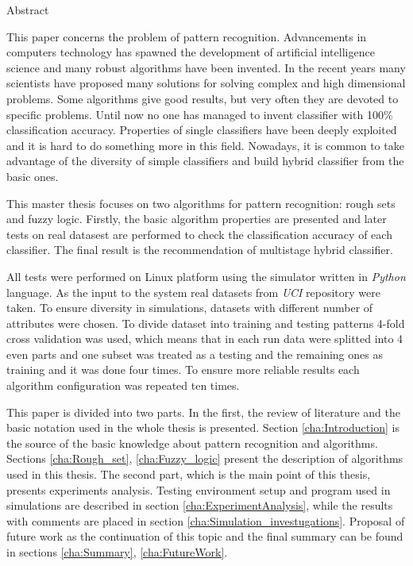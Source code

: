 \thispagestyle{empty}
\begin{center}
	Abstract
\end{center}
This paper concerns the problem of pattern recognition. Advancements in
computers technology has spawned the development of artificial intelligence science and
many robust algorithms have been invented. In the
recent years many scientists have proposed many solutions for solving complex
and high dimensional problems. Some algorithms give good results, but very
often they are devoted to specific problems. Until now no one has managed to
invent classifier with 100\% classification accuracy. Properties of single
classifiers have been deeply exploited and it is hard to do something more in
this field. Nowadays, it is common to take advantage of the diversity of simple classifiers and build 
hybrid classifier from the basic ones.

This master thesis focuses on two algorithms for pattern recognition: rough
sets and fuzzy logic. Firstly, the basic algorithm properties are presented and
later tests on real datasest are performed to check the classification accuracy
of each classifier. The final result is the recommendation of multistage hybrid
classifier.

All tests were performed on Linux platform using the simulator written in
\textit{Python} language. As the input to the system real datasets from
\textit{UCI} repository were taken. To ensure diversity in simulations, datasets
with different number of attributes were chosen. To divide dataset into
training and testing patterns 4-fold cross validation was used, which means
that in each run data were splitted into 4 even parts and one subset was
treated as a testing and the remaining ones as training and it was done four
times. To ensure more reliable results each algorithm configuration was repeated
ten times.

This paper is divided into two parts.  In the first, the review of
literature and the basic notation used in the whole thesis is presented. Section
\ref{cha:Introduction} is the source of the basic
knowledge about pattern recognition and algorithms. Sections \ref{cha:Rough_set}, \ref{cha:Fuzzy_logic}
present the description of algorithms used in this thesis. The second part,
which is the main point of this thesis, presents experiments analysis. Testing
environment setup and program used in simulations are described in section
\ref{cha:ExperimentAnalysis}, while the results with comments are placed in
section \ref{cha:Simulation_investugations}. Proposal of future work as the 
continuation of this topic and the final summary can be found in
sections \ref{cha:Summary}, \ref{cha:FutureWork}.

